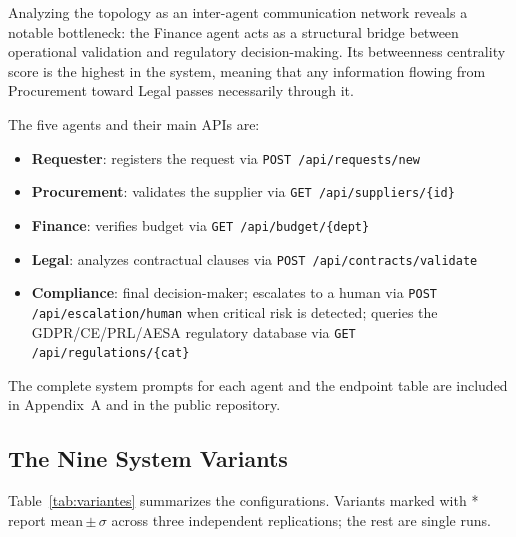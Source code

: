 \documentclass[preprint,12pt,numrefs]{elsarticle}
\begin{document}
Analyzing the topology as an inter-agent communication network reveals
a notable bottleneck: the Finance agent acts as a structural bridge
between operational validation and regulatory decision-making. Its
betweenness centrality score is the highest in the system, meaning that
any information flowing from Procurement toward Legal passes necessarily
through it.
\medskip

The five agents and their main APIs are:
{\small
\begin{itemize}
  \item \textbf{Requester}: registers the request via
        \texttt{POST /api/requests/new}
  \item \textbf{Procurement}: validates the supplier via
        \texttt{GET /api/suppliers/\{id\}}
  \item \textbf{Finance}: verifies budget via
        \texttt{GET /api/budget/\{dept\}}
  \item \textbf{Legal}: analyzes contractual clauses via
        \texttt{POST /api/contracts/validate}
  \item \textbf{Compliance}: final decision-maker; escalates to a human via
        \texttt{POST /api/escalation/human} when critical risk is detected;
        queries the GDPR/CE/PRL/AESA regulatory database via
        \texttt{GET /api/regulations/\{cat\}}
\end{itemize}
}

The complete system prompts for each agent and the endpoint table are
included in Appendix~A and in the public repository.

\subsection{The Nine System Variants}

Table~\ref{tab:variantes} summarizes the configurations. Variants marked
with * report mean\,$\pm$\,$\sigma$ across three independent replications;
the rest are single runs.
\end{document}
